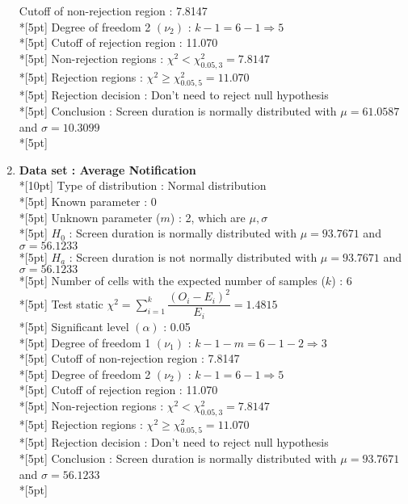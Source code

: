\begin{enumerate}
        Cutoff of non-rejection region : 7.8147\\*[5pt]
        Degree of freedom 2 \((\nu_2)\) : $k - 1 = 6 - 1 \Rightarrow 5$\\*[5pt]
        Cutoff of rejection region : 11.070\\*[5pt]
        Non-rejection regions : \(\chi^2 < \chi^2_{0.05, 3}=7.8147\)\\*[5pt]
        Rejection regions : \(\chi^2 \geq \chi^2_{0.05, 5}=11.070\)\\*[5pt]
        Rejection decision : Don't need to reject null hypothesis\\*[5pt]
        Conclusion : Screen duration is normally distributed with $\mu=61.0587$ and $\sigma=10.3099$\\*[5pt]
    \item \textbf{Data set : Average Notification}\\*[10pt]
        Type of distribution : Normal distribution\\*[5pt]
        Known parameter : 0\\*[5pt]
        Unknown parameter ($m$) : 2, which are \(\mu, \sigma\)\\*[5pt]
        $H_0$ : Screen duration is normally distributed with $\mu=93.7671$ and $\sigma=56.1233$\\*[5pt]
        $H_a$ : Screen duration is not normally distributed with $\mu=93.7671$ and $\sigma=56.1233$\\*[5pt]
        Number of cells with the expected number of samples ($k$) : 6\\*[5pt]
        Test static \(\chi^2=\displaystyle\sum\limits^k_{i=1}\dfrac{\left(O_i-E_i\right)^2}{E_i}=1.4815\)\\*[5pt]
        Significant level \(\left(\alpha\right)\) : 0.05\\*[5pt]
        Degree of freedom 1 \((\nu_1)\) : $k - 1 - m = 6 - 1 - 2 \Rightarrow 3$\\*[5pt]
        Cutoff of non-rejection region : 7.8147\\*[5pt]
        Degree of freedom 2 \((\nu_2)\) : $k - 1 = 6 - 1 \Rightarrow 5$\\*[5pt]
        Cutoff of rejection region : 11.070\\*[5pt]
        Non-rejection regions : \(\chi^2 < \chi^2_{0.05, 3}=7.8147\)\\*[5pt]
        Rejection regions : \(\chi^2 \geq \chi^2_{0.05, 5}=11.070\)\\*[5pt]
        Rejection decision : Don't need to reject null hypothesis\\*[5pt]
        Conclusion : Screen duration is normally distributed with $\mu=93.7671$ and $\sigma=56.1233$\\*[5pt]
\end{enumerate}
